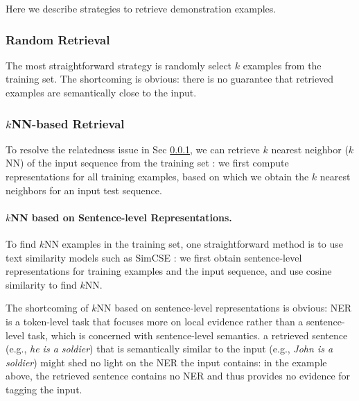 \documentclass{article}
\begin{document}
Here we describe strategies to retrieve demonstration examples. 
\subsubsection{Random Retrieval}
\label{random_retrieval}
The most straightforward strategy is randomly select $k$ examples from the training set. 
The shortcoming is obvious: there is no guarantee that retrieved examples are semantically close to the input. 

\subsubsection{$k$NN-based Retrieval}
To resolve the relatedness issue in Sec \ref{random_retrieval}, 
we can retrieve  
 $k$ nearest neighbor ($k$NN) of the input sequence from the training set \cite{vilar2022prompting, liu2021makes}:
 we first compute 
 representations for all training examples, based on which we obtain the  $k$ nearest neighbors for an input test sequence. 
 
 


\paragraph{$k$NN based on Sentence-level Representations.}
To find $k$NN examples in the training set, one straightforward method is to  use text similarity models such as SimCSE \cite{gao2021simcse}:
we first obtain sentence-level representations for training examples and the input sequence, and use cosine similarity to find $k$NN.

The shortcoming of $k$NN based on sentence-level representations is obvious:
NER is a token-level task that focuses more on local evidence rather than a sentence-level task, which is concerned with sentence-level semantics.
 a retrieved sentence (e.g., {\it he is a soldier}) that is semantically similar to the input (e.g., {\it John is a soldier})  might shed no light on the NER the input contains:
 in the example above, the retrieved sentence contains no NER and thus provides no evidence for tagging the input.  
\end{document}
